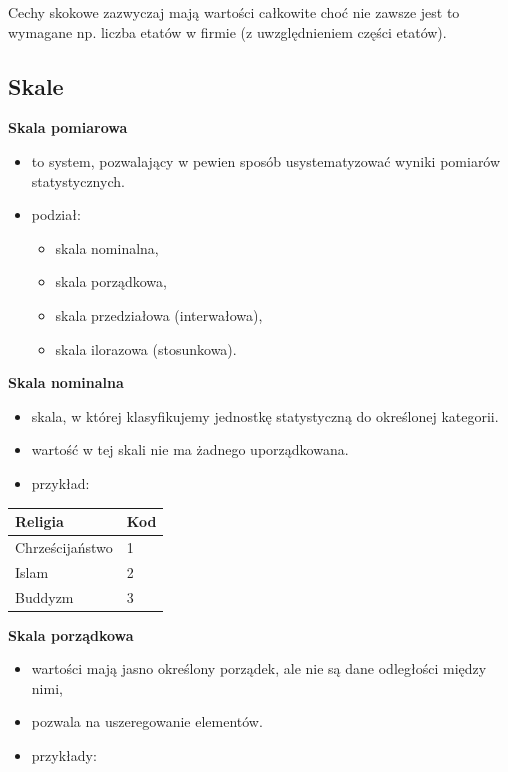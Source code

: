\documentclass[
  polish,
  letterpaper,
  DIV=11,
  numbers=noendperiod]{scrreprt}
\providecommand{\tightlist}{%
  \setlength{\itemsep}{0pt}\setlength{\parskip}{0pt}}
\begin{document}
Cechy skokowe zazwyczaj mają wartości całkowite choć nie zawsze jest to
wymagane np. liczba etatów w firmie (z uwzględnieniem części etatów).

\subsection{Skale}\label{skale}

\textbf{Skala pomiarowa}

\begin{itemize}
\tightlist
\item
  to system, pozwalający w pewien sposób usystematyzować wyniki pomiarów
  statystycznych.
\item
  podział:

  \begin{itemize}
  \tightlist
  \item
    skala nominalna,
  \item
    skala porządkowa,
  \item
    skala przedziałowa (interwałowa),
  \item
    skala ilorazowa (stosunkowa).
  \end{itemize}
\end{itemize}

\textbf{Skala nominalna}

\begin{itemize}
\tightlist
\item
  skala, w której klasyfikujemy jednostkę statystyczną do określonej
  kategorii.
\item
  wartość w tej skali nie ma żadnego uporządkowana.
\item
  przykład:
\end{itemize}

\begin{longtable}[]{@{}ll@{}}
\toprule\noalign{}
Religia & Kod \\
\midrule\noalign{}
\endhead
\bottomrule\noalign{}
\endlastfoot
Chrześcijaństwo & 1 \\
Islam & 2 \\
Buddyzm & 3 \\
\end{longtable}

\textbf{Skala porządkowa}

\begin{itemize}
\tightlist
\item
  wartości mają jasno określony porządek, ale nie są dane odległości
  między nimi,
\item
  pozwala na uszeregowanie elementów.
\item
  przykłady:
\end{itemize}
\end{document}
